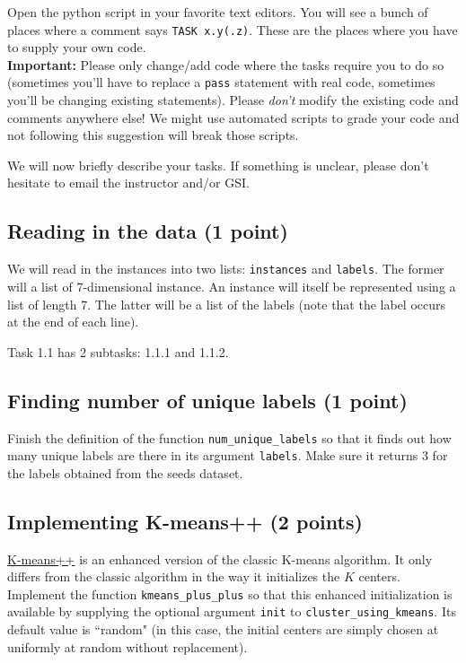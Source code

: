 \documentclass{article}
\begin{document}
Open the python script in your favorite text editors. You will see a bunch of places where a comment says {\tt TASK x.y(.z)}. These are the places where you have to supply your
own code.\\
{\bf Important:} Please only change/add code where the tasks require you to do so (sometimes you'll have to replace a {\tt pass} statement with real code, sometimes you'll be changing existing statements). Please {\em don't} modify the existing code and comments anywhere else! We might use automated scripts to grade your code and not following this suggestion will break those scripts.

We will now briefly describe your tasks. If something is unclear, please don't hesitate to email the instructor and/or GSI.

\subsection{Reading in the data (1 point)}

We will read in the instances into two lists: {\tt instances} and {\tt labels}. The former will a list of 7-dimensional instance. An instance will itself be represented using a list of length 7.
The latter will be a list of the labels (note that the label occurs at the end of each line).

Task 1.1 has 2 subtasks: 1.1.1 and 1.1.2.

\subsection{Finding number of unique labels (1 point)}

Finish the definition of the function {\tt num\_unique\_labels} so that it finds out how many unique labels are there in its argument {\tt labels}. Make sure it returns 3 for the labels obtained
from the seeds dataset.

\subsection{Implementing K-means++ (2 points)}

\href{http://en.wikipedia.org/wiki/K-means\%2B\%2B}{K-means++} is an enhanced version of the classic K-means algorithm. It only differs from the classic algorithm in the way it initializes the $K$ centers.
Implement the function {\tt kmeans\_plus\_plus} so that this enhanced initialization is available by supplying the optional argument {\tt init} to {\tt cluster\_using\_kmeans}. Its default value is ``random" (in this case,
the initial centers are simply chosen at uniformly at random without replacement).
\end{document}
